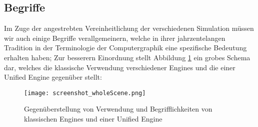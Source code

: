 	


\subsection{Begriffe}

Im Zuge der angestrebten Vereinheitlichung der  verschiedenen Simulation müssen wir auch einige Begriffe verallgemeinern, 
welche in ihrer jahrzentelangen Tradition in der Terminologie der Computergraphik eine spezifische Bedeutung erhalten haben;
Zur besserern Einordnung stellt Abbildung \ref{fig:classicalVsUnified} ein grobes Schema dar, welches die klassische Verwendung verschiedener Engines und die einer Unified Engine gegenüber stellt:



	\begin{figure}
	
	   \texttt{[image: screenshot\_wholeScene.png]}

		\caption{Gegenüberstellung von Verwendung und Begrifflichkeiten von klassischen Engines und einer Unified Engine}
		\label{fig:classicalVsUnified}
	\end{figure}
	




